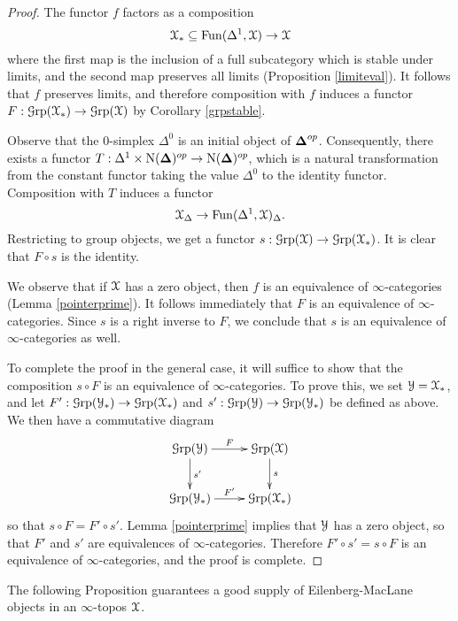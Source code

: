 \begin{proof}
The functor $f$ factors as a composition
$$ \operatorname{\mathcal{X}}_{\ast} \subseteq \operatorname{Fun}(\Delta^1,\operatorname{\mathcal{X}}) \rightarrow \operatorname{\mathcal{X}}$$
where the first map is the inclusion of a full subcategory which is stable under limits,
and the second map preserves all limits (Proposition \ref{limiteval}). It follows that $f$ preserves limits, and therefore composition with $f$ induces a functor $F: \operatorname{\mathcal{G}rp}(\operatorname{\mathcal{X}}_{\ast}) \rightarrow \operatorname{\mathcal{G}rp}(\operatorname{\mathcal{X}})$ by Corollary \ref{grpstable}. 

Observe that the $0$-simplex $\Delta^0$ is an initial object of $\operatorname{{\bf \Delta}}^{op}$. Consequently, there exists a functor $T: \Delta^1 \times \operatorname{N}(\operatorname{{\bf \Delta}})^{op} \rightarrow \operatorname{N}(\operatorname{{\bf \Delta}})^{op}$, which is a natural transformation from the constant functor taking the value $\Delta^0$ to the identity functor. Composition with $T$ induces a functor
$$ \operatorname{\mathcal{X}}_{\Delta} \rightarrow \operatorname{Fun}(\Delta^1,\operatorname{\mathcal{X}})_{\Delta}.$$
Restricting to group objects, we get a functor $s: \operatorname{\mathcal{G}rp}(\operatorname{\mathcal{X}}) \rightarrow \operatorname{\mathcal{G}rp}(\operatorname{\mathcal{X}}_{\ast})$.
It is clear that $F \circ s$ is the identity. 

We observe that if $\operatorname{\mathcal{X}}$ has a zero object, then
$f$ is an equivalence of $\infty$-categories (Lemma \ref{pointerprime}). It follows immediately that $F$ is an equivalence of $\infty$-categories. Since $s$ is a right inverse to $F$, we conclude that $s$ is an equivalence of $\infty$-categories as well.

To complete the proof in the general case, it will suffice to show that the composition $s \circ F$ is an equivalence of $\infty$-categories. To prove this, we set $\operatorname{\mathcal{Y}} = \operatorname{\mathcal{X}}_{\ast}$, and let
$F': \operatorname{\mathcal{G}rp}(\operatorname{\mathcal{Y}}_{\ast}) \rightarrow \operatorname{\mathcal{G}rp}(\operatorname{\mathcal{X}}_{\ast})$ and $s': \operatorname{\mathcal{G}rp}(\operatorname{\mathcal{Y}}) \rightarrow \operatorname{\mathcal{G}rp}(\operatorname{\mathcal{Y}}_{\ast})$ be defined as above. We then have a commutative diagram
$$ \xymatrix{ \Group(\calY) \ar[r]^-{F} \ar[d]^-{s'} & \Group(\calX) \ar[d]^-{s} \\
\Group(\calY_{\ast}) \ar[r]^-{F'} & \Group(\calX_{\ast}) }$$ 
so that $s \circ F = F' \circ s'$. Lemma \ref{pointerprime} implies that $\operatorname{\mathcal{Y}}$ has a zero object, so that $F'$ and $s'$ are equivalences of $\infty$-categories. Therefore $F' \circ s' = s \circ F$ is an equivalence of $\infty$-categories, and the proof is complete.
\end{proof}

The following Proposition guarantees a good supply of Eilenberg-MacLane objects in an $\infty$-topos $\operatorname{\mathcal{X}}$.


